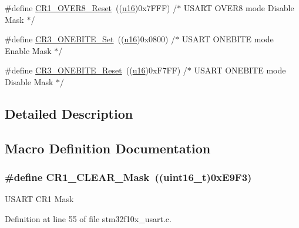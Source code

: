 \begin{DoxyCompactItemize}
\item 
\#define \hyperlink{group___u_s_a_r_t___private___defines_gaf84165f2974000906c495b3c27dc5121}{C\+R1\+\_\+\+O\+V\+E\+R8\+\_\+\+Reset}~((\hyperlink{agilefox_2library_2inc_2stm32f10x__type_8h_a9e6c91d77e24643b888dbd1a1a590054}{u16})0x7\+F\+F\+F)  /$\ast$ U\+S\+A\+R\+T O\+V\+E\+R8 mode Disable Mask $\ast$/
\item 
\#define \hyperlink{group___u_s_a_r_t___private___defines_gac512024dda541435acfe0b50de925105}{C\+R3\+\_\+\+O\+N\+E\+B\+I\+T\+E\+\_\+\+Set}~((\hyperlink{agilefox_2library_2inc_2stm32f10x__type_8h_a9e6c91d77e24643b888dbd1a1a590054}{u16})0x0800)  /$\ast$ U\+S\+A\+R\+T O\+N\+E\+B\+I\+T\+E mode Enable Mask $\ast$/
\item 
\#define \hyperlink{group___u_s_a_r_t___private___defines_ga55dc289819dde550630df98267bbef52}{C\+R3\+\_\+\+O\+N\+E\+B\+I\+T\+E\+\_\+\+Reset}~((\hyperlink{agilefox_2library_2inc_2stm32f10x__type_8h_a9e6c91d77e24643b888dbd1a1a590054}{u16})0x\+F7\+F\+F)  /$\ast$ U\+S\+A\+R\+T O\+N\+E\+B\+I\+T\+E mode Disable Mask $\ast$/
\end{DoxyCompactItemize}


\subsection{Detailed Description}


\subsection{Macro Definition Documentation}
\subsubsection[{\texorpdfstring{C\+R1\+\_\+\+C\+L\+E\+A\+R\+\_\+\+Mask}{CR1_CLEAR_Mask}}]{\setlength{\rightskip}{0pt plus 5cm}\#define C\+R1\+\_\+\+C\+L\+E\+A\+R\+\_\+\+Mask~(({\bf uint16\+\_\+t})0x\+E9\+F3)}\hypertarget{group___u_s_a_r_t___private___defines_ga67f7dd35ea3d1296677e5fc50b88fa90}{}\label{group___u_s_a_r_t___private___defines_ga67f7dd35ea3d1296677e5fc50b88fa90}
U\+S\+A\+RT C\+R1 Mask 

Definition at line 55 of file stm32f10x\+\_\+usart.\+c.

